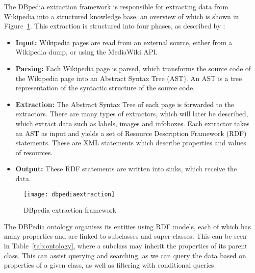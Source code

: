The DBpedia extraction framework is responsible for extracting data from Wikipedia into a structured knowledge base, an overview of which is shown in Figure~\ref{fig:extraction}. This extraction is structured into four phases, as described by \citet{lehmann2015dbpedia}:

\begin{itemize}[label={},itemindent=-2em,leftmargin=2em]
	\item {\bf Input:} Wikipedia pages are read from an external source, either from a Wikipedia dump, or using the MediaWiki API.
	\item {\bf Parsing:} Each Wikipedia page is parsed, which transforms the source code of the Wikipedia page into an Abstract Syntax Tree (AST). An AST is a tree representation of the syntactic structure of the source code.
	\item {\bf Extraction:} The Abstract Syntax Tree of each page is forwarded to the extractors. There are many types of extractors, which will later be described, which extract data such as labels, images and infoboxes. Each extractor takes an AST as input and yields a set of Resource Description Framework (RDF) statements. These are XML statements which describe properties and values of resources.
	\item {\bf Output:} These RDF statements are written into sinks, which receive the data.
\end{itemize}

\begin{figure}[h]
	\begin{center}
		\texttt{[image: dbpediaextraction]}
	\end{center}
	\caption{DBpedia extraction framework \cite{bizer2009dbpedia}}
	\label{fig:extraction}
\end{figure}

The DBPedia ontology organises its entities using RDF models, each of which has many properties and are linked to subclasses and super-classes. This can be seen in Table~\ref{tab:ontology}, where a subclass may inherit the properties of its parent class. This can assist querying and searching, as we can query the data based on properties of a given class, as well as filtering with conditional queries. 

